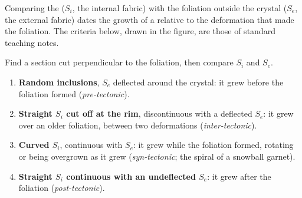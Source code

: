 Comparing the  ($S_i$, the internal fabric) with the foliation outside the crystal
($S_e$, the external fabric) dates the growth of a  relative to the deformation that
made the foliation. The criteria below, drawn in the figure, are those of standard teaching notes.

\begin{method}\label{met:b2:field-lab-methods-2:timing}
Find a section cut perpendicular to the foliation, then compare $S_i$ and $S_e$.
\begin{enumerate}
  \item \textbf{Random inclusions}, $S_e$ deflected around the crystal: it grew before the
        foliation formed (\emph{pre-tectonic}).
  \item \textbf{Straight $S_i$ cut off at the rim}, discontinuous with a deflected $S_e$: it grew
        over an older foliation, between two deformations (\emph{inter-tectonic}).
  \item \textbf{Curved $S_i$}, continuous with $S_e$: it grew while the foliation formed, rotating
        or being overgrown as it grew (\emph{syn-tectonic}; the spiral of a snowball garnet).
  \item \textbf{Straight $S_i$ continuous with an undeflected $S_e$}: it grew after the foliation
        (\emph{post-tectonic}).
\end{enumerate}
\end{method}

